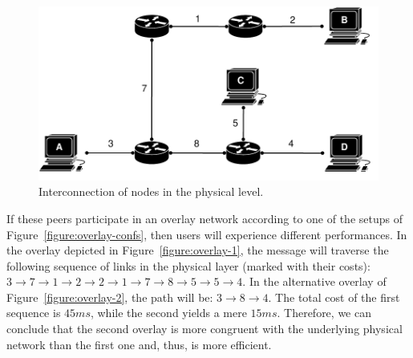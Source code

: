 \begin{figure}
\centering
  \includegraphics[scale=0.7]{img/pdf/example-physical.pdf}
\caption{Interconnection of nodes in the physical level.}
\label{figure:phys}
\end{figure}

If these peers participate in an overlay network according to one of the setups
of Figure~\ref{figure:overlay-confs}, then users will experience different
performances. In the overlay depicted in Figure~\ref{figure:overlay-1}, the
message will traverse the following sequence of links in the physical layer
(marked with their costs): $3 \rightarrow 7 \rightarrow 1 \rightarrow 2
\rightarrow 2 \rightarrow 1 \rightarrow 7 \rightarrow 8 \rightarrow 5
\rightarrow 5 \rightarrow 4$. In the alternative overlay of
Figure~\ref{figure:overlay-2}, the path will be: $3 \rightarrow 8 \rightarrow
4$. The total cost of the first sequence is $45 ms$, while the second yields a
mere $15 ms$. Therefore, we can conclude that the second overlay is more
congruent with the underlying physical network than the first one and, thus, is
more efficient.

